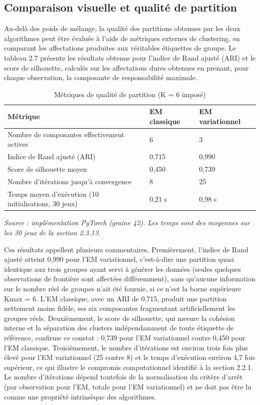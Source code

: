 \subsection{Comparaison visuelle et qualité de partition}
Au-delà des poids de mélange, la qualité des partitions obtenues par les deux algorithmes peut être évaluée à l'aide de métriques externes de clustering, en comparant les affectations produites aux véritables étiquettes de groupe. Le tableau 2.7 présente les résultats obtenus pour l'indice de Rand ajusté (ARI) et le score de silhouette, calculés sur les affectations dures obtenues en prenant, pour chaque observation, la composante de responsabilité maximale.

\begin{table}[H]
\centering
\small
\setlength{\tabcolsep}{0.14cm}
\begin{tabular}{|p{4.84cm}|p{4.84cm}|p{4.84cm}|}
\hline
\textbf{Métrique} & \textbf{EM classique} & \textbf{EM variationnel} \\
\hline
Nombre de composantes effectivement actives & 6 & 3 \\
\hline
Indice de Rand ajusté (ARI) & 0,715 & 0,990 \\
\hline
Score de silhouette moyen & 0,450 & 0,739 \\
\hline
Nombre d'itérations jusqu'à convergence & 8 & 25 \\
\hline
Temps moyen d'exécution (10 initialisations, 30 jeux) & 0,21 s & 0,98 s \\
\hline
\end{tabular}
\caption{Métriques de qualité de partition (K = 6 imposé)}
\label{tab:2_7}
\end{table}
\emph{Source : implémentation PyTorch (graine 42). Les temps sont des moyennes sur les 30 jeux de la section 2.3.13.}

Ces résultats appellent plusieurs commentaires. Premièrement, l'indice de Rand ajusté atteint 0,990 pour l'EM variationnel, c'est-à-dire une partition quasi identique aux trois groupes ayant servi à générer les données (seules quelques observations de frontière sont affectées différemment), sans qu'aucune information sur le nombre réel de groupes n'ait été fournie, si ce n'est la borne supérieure Kmax = 6. L'EM classique, avec un ARI de 0,715, produit une partition nettement moins fidèle, ses six composantes fragmentant artificiellement les groupes réels. Deuxièmement, le score de silhouette, qui mesure la cohésion interne et la séparation des clusters indépendamment de toute étiquette de référence, confirme ce constat : 0,739 pour l'EM variationnel contre 0,450 pour l'EM classique. Troisièmement, le nombre d'itérations est environ trois fois plus élevé pour l'EM variationnel (25 contre 8) et le temps d'exécution environ 4,7 fois supérieur, ce qui illustre le compromis computationnel identifié à la section 2.2.1. Le nombre d'itérations dépend toutefois de la normalisation du critère d'arrêt (par observation pour l'EM, totale pour l'EM variationnel) et ne doit pas être lu comme une propriété intrinsèque des algorithmes.

